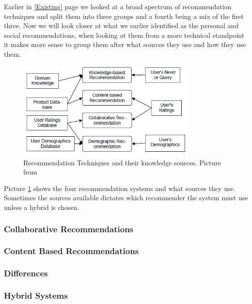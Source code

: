 Earlier in \ref{Existing} page \pageref{Existing} we looked at a broad spectrum of recommendation techniques and  split them into three groups and a fourth being a mix of the first three. Now we will look closer at what we earlier identified as the personal and social recommendations, when looking at them from a more technical standpoint it makes more sense to group them after what sources they use and how they use them.

\begin{figure}[H]
\centering
\includegraphics[width=0.8\textwidth]{Images/RecTypes.png}
\caption{Recommendation Techniques and their knowledge sources. Picture from \cite{TheAdaptiveWeb}}
\label{RecTypes}
\end{figure}

Picture \ref{RecTypes} shows the four recommendation systems and what sources they use. Sometimes the sources available dictates which recommender the system must use unless a hybrid is chosen. 


\subsubsection{Collaborative Recommendations} 
\label{Collaborative} 

\subsubsection{Content Based Recommendations} 
\label{ContentBased} 

\subsubsection{Differences}
\label{Differences} 

\subsubsection{Hybrid Systems} 
\label{Hybrid} 
